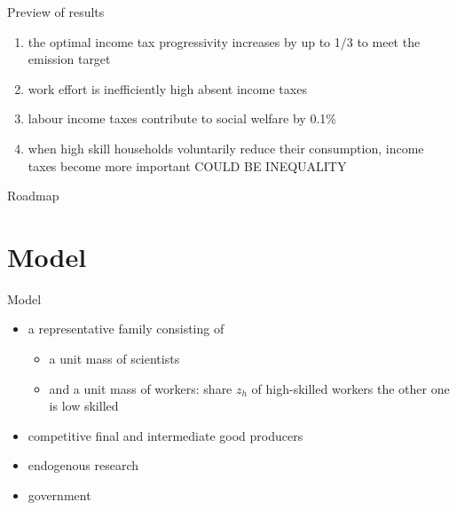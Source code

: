 \documentclass[11pt,aspectratio=169]{beamer}
\begin{document}

\begin{frame}{Preview of results}
\begin{enumerate}
	\item<+-> the optimal income tax progressivity increases by up to 1/3 to meet the emission target 
		\vspace{3mm}
		\item<+-> work effort is inefficiently high absent income taxes 
		\vspace{3mm}
	\item<+-> labour income taxes contribute to social welfare by 0.1\% %
	
	\vspace{3mm}
	\item<+-> when high skill households voluntarily reduce their consumption, income taxes become more important COULD BE INEQUALITY
\end{enumerate}
\end{frame}
\begin{frame}{Roadmap}
	\tableofcontents
\end{frame}

\section{Model}
\begin{frame}{Model}

	\vspace{-2mm}
	\begin{itemize}
		\item a representative family consisting of
		\begin{itemize}
		\item a unit mass of scientists 
		\item and a unit mass of workers: share $z_h$ of high-skilled workers the other one is low skilled
		
		\end{itemize}
		\item competitive final and intermediate good producers
		\item endogenous research
		\item government
	\end{itemize} 
\end{frame}
\end{document}
